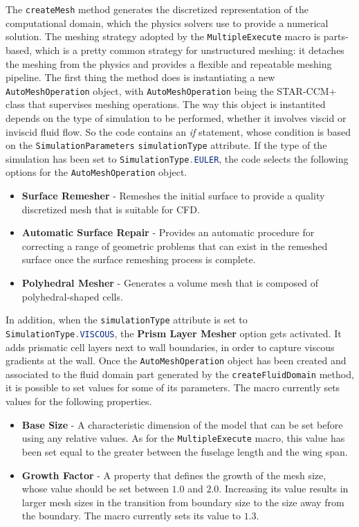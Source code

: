 The \lstinline[language=Java]!createMesh! method generates the discretized representation of the computational domain, which the physics solvers use to provide a numerical solution. The meshing strategy adopted by the \lstinline[language=Java]!MultipleExecute! macro is parts-based, which is a pretty common strategy for unstructured meshing: it detaches the meshing from the physics and provides a flexible and repeatable meshing pipeline. The first thing the method does is instantiating a new \lstinline[language=Java]!AutoMeshOperation! object, with \lstinline[language=Java]!AutoMeshOperation! being the STAR-CCM+ class that supervises meshing operations. The way this object is instantited depends on the type of simulation to be performed, whether it involves viscid or inviscid fluid flow. So the code contains an \emph{if} statement, whose condition is based on the \lstinline[language=Java]!SimulationParameters! \lstinline[language=Java]!simulationType! attribute. If the type of the simulation has been set to \lstinline[language=Java]!SimulationType.EULER!, the code selects the following options for the \lstinline[language=Java]!AutoMeshOperation! object.
%
\begin{itemize}
\renewcommand\labelitemi{\tiny$\blacksquare$}
\renewcommand\labelitemii{\tiny$\bullet$}
\item \textbf{Surface Remesher} - Remeshes the initial surface to provide a quality discretized mesh that is suitable for \gls{CFD}.
\item \textbf{Automatic Surface Repair} - Provides an automatic procedure for correcting a range of geometric problems that can exist in the remeshed surface once the surface remeshing process is complete.
\item \textbf{Polyhedral Mesher} - Generates a volume mesh that is composed of polyhedral-shaped cells.
\end{itemize} 
%
In addition, when the \lstinline[language=Java]!simulationType! attribute is set to \lstinline[language=Java]!SimulationType.VISCOUS!, the \textbf{Prism Layer Mesher} option gets activated. It adds prismatic cell layers next to wall boundaries, in order to capture viscous gradients at the wall. Once the \lstinline[language=Java]!AutoMeshOperation! object has been created and associated to the fluid domain part generated by the \lstinline[language=Java]!createFluidDomain! method, it is possible to set values for some of its parameters. The macro currently sets values for the following properties.
%
\begin{itemize}
\renewcommand\labelitemi{\tiny$\blacksquare$}
\renewcommand\labelitemii{\tiny$\bullet$}
\item \textbf{Base Size} - A characteristic dimension of the model that can be set before using any relative values. As for the \lstinline[language=Java]!MultipleExecute! macro, this value has been set equal to the greater between the fuselage length and the wing span.
\item \textbf{Growth Factor} - A property that defines the growth of the mesh size, whose value should be set between $1.0$ and $2.0$. Increasing its value results in larger mesh sizes in the transition from boundary size to the size away from the boundary. The macro currently sets its value to $1.3$.
\end{itemize}
